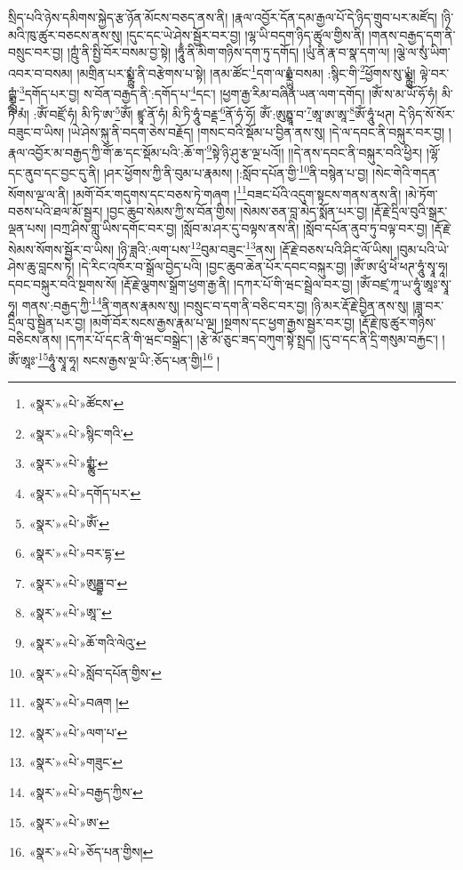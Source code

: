 སྲིད་པའི་ཉེས་དམིགས་སྐྱེད་རྩ་ཉོན་མོངས་བཅད་ནས་ནི། །རྣལ་འབྱོར་དོན་དམ་རྒྱལ་པོ་དེ་ཉིད་གྲུབ་པར་མཛོད། །ཉི་མའི་ཁུ་ཚུར་བཅངས་ནས་སུ། །དུང་དང་ཡེ་ཤེས་སྦྱོར་བར་བྱ། །ལྷ་ཡི་བདག་ཉིད་ཚུལ་གྱིས་ནི། །གནས་བརྒྱད་དག་ནི་བསྲུང་བར་བྱ། །ཀྵུཾ་ནི་སྤྱི་བོར་བསམ་བྱ་སྟེ། །ཧཱུྃ་ནི་མིག་གཉིས་དག་ཏུ་དགོད། །ཡུཾ་ནི་རྣ་བ་སྣ་དག་ལ། །ལྕེ་ལ་སུཾ་ཡིག་འབར་བ་བསམ། །མགྲིན་པར་སྨྼྻུཾ་ནི་བརྩེགས་པ་སྟེ། །ནམ་ཚོང་\footnote{«སྣར་»«པེ་»ཚོངས་}དག་ལ་ཧྨྼྻུཾ་བསམ། :སྙིང་གི་\footnote{«སྣར་»«པེ་»སྙིང་གའི་}ཕྱོགས་སུ་ཡྨྼྻུཾ། ལྟེ་བར་ཀྵྨྼྻུཾ་\footnote{«སྣར་»«པེ་»གྨྪུཾ་}དགོད་པར་བྱ། ས་བོན་བརྒྱད་ནི་:དགོད་པ་\footnote{«སྣར་»«པེ་»དགོད་པར་}དང་། །ཕྱག་རྒྱ་རིམ་བཞིན་ཡན་ལག་དགོད། །ཨོཾ་ས་མ་ཡོ་ཧོ་ཧཾ། མི་ཏི་མཾ། :ཨོཾ་བཛྲོ་ཧཾ། མི་ཏི་ཨ་\footnote{«སྣར་»«པེ་»ཨོཾ་}ཨོཾ། ཛྙཱ་ནོ་ཧཾ། མི་ཏི་ཧཱུཾ་བརྡྡ་\footnote{«སྣར་»«པེ་»བར་དྷ་}ནོ་ཧཾ་ཧོ། ཨོཾ་:ཨུཏྤྷཱ་བ་\footnote{«སྣར་»«པེ་»ཨུཏྦྷ་བ་}ཨཱ་ཨ་ཨཱ་\footnote{«སྣར་»«པེ་»ཨཱ་་}ཨོཾ་ཧཱུཾ་ཕཊ། དེ་ཉིད་སོ་སོར་བཟུང་བ་ཡིས། །ཡེ་ཤེས་སྐུ་ནི་བདག་ཅེས་བརྗོད། །གསང་བའི་སྡོམ་པ་བྱིན་ནས་སུ། །དེ་ལ་དབང་ནི་བསྐུར་བར་བྱ། །རྣལ་འབྱོར་མ་བརྒྱད་ཀྱི་གོ་ཆ་དང་སྡོམ་པའི་:ཆོ་ག་\footnote{«སྣར་»«པེ་»ཆོ་གའི་ལེའུ་}སྟེ་ཉི་ཤུ་རྩ་ལྔ་པའོ།། །།དེ་ནས་དབང་ནི་བསྐུར་བའི་ཕྱིར། །ལྷོ་དང་ནུབ་དང་བྱང་དུ་ནི། །ཤར་ཕྱོགས་ཀྱི་ནི་བུམ་པ་རྣམས། །:སློབ་དཔོན་གྱི་\footnote{«སྣར་»«པེ་»སློབ་དཔོན་གྱིས་}ནི་བསྙེན་པ་བྱ། །སེང་གེའི་གདན་སོགས་ལྔ་ལ་ནི། །མགོ་བོར་གདུགས་དང་བཅས་ཏེ་གཞག །\footnote{«སྣར་»«པེ་»བཞག །}བཟང་པོའི་འདུག་སྟངས་གནས་ནས་ནི། །མེ་ཏོག་བཅས་པའི་ཐལ་མོ་སྦྱར། །བྱང་ཆུབ་སེམས་ཀྱི་ས་བོན་གྱིས། །སེམས་ཅན་བླ་མེད་སྨོན་པར་བྱ། །རྡོ་རྗེ་དྲིལ་བུའི་སྒྲར་ལྡན་པས། །བཀྲ་ཤིས་གླུ་ཡིས་དགོང་བར་བྱ། །སློབ་མ་ཤར་དུ་བལྟས་ནས་ནི། །སློབ་དཔོན་ནུབ་ཏུ་བལྟ་བར་བྱ། །རྡོ་རྗེ་སེམས་སོགས་སྦྱོར་བ་ཡིས། །ཉི་ཟླའི་:ལག་པས་\footnote{«སྣར་»«པེ་»ལག་པ་}བུམ་བཟུང་\footnote{«སྣར་»«པེ་»གཟུང་}ནས། །རྡོ་རྗེ་བཅས་པའི་ཤིང་ལོ་ཡིས། །བུམ་པའི་ཡེ་ཤེས་ཆུ་བླངས་ཏེ། །དེ་རིང་འཁོར་བ་སྒྲོལ་བྱེད་པའི། །བྱང་ཆུབ་ཆེན་པོར་དབང་བསྐུར་བྱ། །ཨོཾ་ཨ་ཕུཾ་ཕེཾ་ཕཊ་ཧཱུཾ་སྭཱ་ཧཱ། དབང་བསྐུར་བའི་སྔགས་སོ། །རྡོ་རྗེ་ལྕགས་སྒྲོག་ཕྱག་རྒྱ་ནི། །དཀར་པོ་གི་ཝང་སྦྲེལ་བར་བྱ། །ཨོཾ་བཛྲ་ཀཱ་ཡ་ཧཱུཾ་ཨཱཿ་སྭཱ་ཧཱ། གནས་:བརྒྱད་ཀྱི་\footnote{«སྣར་»«པེ་»བརྒྱད་ཀྱིས་}ནི་གནས་རྣམས་སུ། །བསྲུང་བ་དག་ནི་བཅིང་བར་བྱ། །ཉི་མར་རྡོ་རྗེ་བྱིན་ནས་སུ། །ཟླ་བར་དྲིལ་བུ་སྦྱིན་པར་བྱ། །མགོ་བོར་སངས་རྒྱས་རྣམ་པ་ལྔ། །སྔགས་དང་ཕྱག་རྒྱས་སྦྱར་བར་བྱ། །རྡོ་རྗེ་ཁུ་ཚུར་གཉིས་བཅིངས་ནས། །དཀར་པོ་དང་ནི་གི་ཝང་བསྒྲེང་། །རྩེ་མོ་ཅུང་ཟད་བཀུག་སྟེ་སྤྲད། །དུ་བ་དང་ནི་དྲི་གསུམ་བརྐྱང་། །ཨོཾ་ཨཱཿ་\footnote{«སྣར་»«པེ་»ཨ་}ཧཱུཾ་སྭཱ་ཧཱ། སངས་རྒྱས་ལྔ་ཡི་:ཅོད་པན་གྱི།\footnote{«སྣར་»«པེ་»ཅོད་པན་གྱིས།} །
